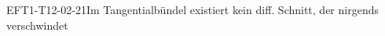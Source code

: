 
\begin{EXA}{EFT1-T12-02-21}{Im Tangentialbündel existiert kein diff. Schnitt, der nirgends verschwindet}
\end{EXA}
